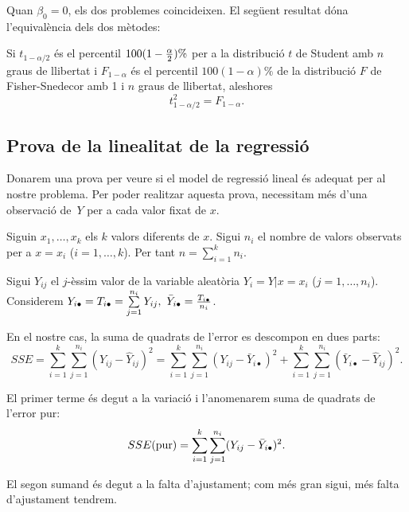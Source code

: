 Quan $\beta_0 = 0$, els dos problemes coincideixen. El seg\"uent resultat d\'ona
l'equival\`encia dels dos m\`etodes:

\begin{proposition}
Si $t_{1-\alpha/2}$ \'es el percentil $100(1-{\alpha \over 2}) \% $ per a
la distribuci\'o $t$ de Student amb $n$ graus de llibertat i 
$F_{1-\alpha}$ \'es el percentil $100 (1-\alpha) \% $ de la distribuci\'o $F$ de Fisher-Snedecor amb 1 i $n$
graus de llibertat, aleshores
$$t_{1-\alpha/2}^2 = F_{1-\alpha}.$$
\end{proposition}

\subsection{Prova de la linealitat de la regressi\'o}

Donarem una prova per veure si el model de regressi\'o lineal 
\'es adequat per al
nostre problema. Per poder realitzar aquesta prova, necessitam m\'es d'una
observaci\'o de~$Y$ per a cada valor fixat de $x$.

Siguin $x_1, \ldots , x_k$ els $k$ valors diferents de $x$. Sigui $n_i$ el nombre
de valors observats per a $x = x_i$ ($i = 1, \ldots , k$). Per tant $n =
\sum\limits_{i=1}^k n_i$.

Sigui $Y_{ij}$ el $j$-\`essim valor de la variable aleat\`oria $Y_i = Y|x=x_i$ ($j =
1, \ldots , n_i$). Considerem $Y_{i\bullet} = T_{i\bullet} = 
\sum\limits_{j=1}^{n_i} Y_{ij},
\ \bar{Y}_{i\bullet} = {T_{i\bullet} \over n_i}$.

En el nostre cas, la suma de quadrats de l'error es descompon en dues parts:
$$SSE = \sum\limits_{i=1}^k \sum\limits_{j=1}^{n_i} (Y_{ij} - \hat{Y}_{ij})^2 
=\sum\limits_{i=1}^k \sum\limits_{j=1}^{n_i} (Y_{ij} - \bar{Y}_{i\bullet})^2 +
\sum\limits_{i=1}^k \sum\limits_{j=1}^{n_i} (\bar{Y}_{i\bullet} - 
\hat{Y}_{ij})^2.$$

El primer terme \'es degut a la variaci\'o i l'anomenarem suma de quadrats de
l'error pur:
$$SSE({\rm pur}) = \sum\limits_{i=1}^k \sum\limits_{j=1}^{n_i} (Y_{ij} -
\bar{Y}_{i\bullet})^2.$$

El segon sumand \'es degut a la falta d'ajustament; 
com m\'es gran sigui, m\'es falta
d'ajustament tendrem.

